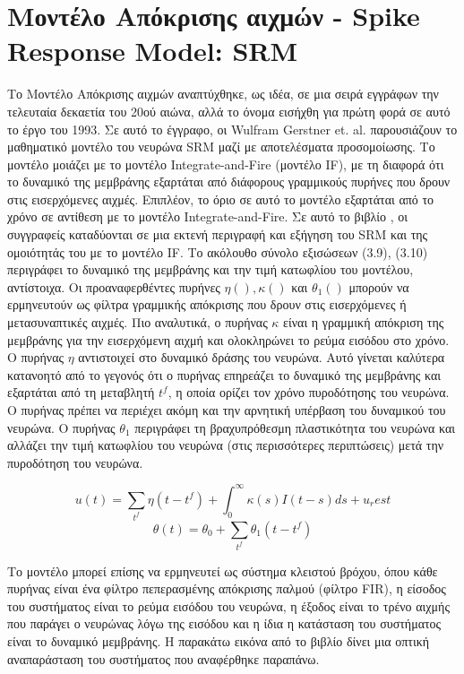 \documentclass[12pt]{report}
\begin{document}
\medskip

\section{Μοντέλο Απόκρισης αιχμών - \textlatin{Spike Response Model: SRM}}

Το Μοντέλο Απόκρισης αιχμών αναπτύχθηκε, ως ιδέα, σε μια σειρά εγγράφων την τελευταία δεκαετία του 20ού αιώνα, αλλά το όνομα εισήχθη για πρώτη φορά σε αυτό το έργο \cite{Gerstner1993} του 1993. Σε αυτό το έγγραφο, οι \textlatin{Wulfram Gerstner et. al.} παρουσιάζουν το μαθηματικό μοντέλο του νευρώνα \textlatin{SRM} μαζί με αποτελέσματα προσομοίωσης. Το μοντέλο μοιάζει με το μοντέλο \textlatin{Integrate-and-Fire} (μοντέλο \textlatin{IF}), με τη διαφορά ότι το δυναμικό της μεμβράνης εξαρτάται από διάφορους γραμμικούς πυρήνες που δρουν στις εισερχόμενες αιχμές. Επιπλέον, το όριο σε αυτό το μοντέλο εξαρτάται από το χρόνο σε αντίθεση με το μοντέλο \textlatin{Integrate-and-Fire}. Σε αυτό το βιβλίο \cite{gerstner2014}, οι συγγραφείς καταδύονται σε μια εκτενή περιγραφή και εξήγηση του \textlatin{SRM} και της ομοιότητάς του με το μοντέλο \textlatin{IF}. Το ακόλουθο σύνολο εξισώσεων (3.9), (3.10) περιγράφει το δυναμικό της μεμβράνης και την τιμή κατωφλίου του μοντέλου, αντίστοιχα. Οι προαναφερθέντες πυρήνες \(\eta(), \kappa()\) και \(\theta_1()\) μπορούν να ερμηνευτούν ως φίλτρα γραμμικής απόκρισης που δρουν στις εισερχόμενες ή μετασυναπτικές αιχμές. Πιο αναλυτικά, ο πυρήνας \(\kappa\) είναι η γραμμική απόκριση της μεμβράνης για την εισερχόμενη αιχμή και ολοκληρώνει το ρεύμα εισόδου στο χρόνο. Ο πυρήνας \(\eta\) αντιστοιχεί στο δυναμικό δράσης του νευρώνα. Αυτό γίνεται καλύτερα κατανοητό από το γεγονός ότι ο πυρήνας επηρεάζει το δυναμικό της μεμβράνης και εξαρτάται από τη μεταβλητή \(t^f\), η οποία ορίζει τον χρόνο πυροδότησης του νευρώνα. Ο πυρήνας πρέπει να περιέχει ακόμη και την αρνητική υπέρβαση του δυναμικού του νευρώνα. Ο πυρήνας \(\theta_1\) περιγράφει τη βραχυπρόθεσμη πλαστικότητα του νευρώνα και αλλάζει την τιμή κατωφλίου του νευρώνα (στις περισσότερες περιπτώσεις) μετά την πυροδότηση του νευρώνα.

\begin{equation}
u(t) = \sum_{t^f}\eta(t-t^f)+\int_0^\infty\kappa(s)I(t-s)ds+u_rest
\end{equation}
\begin{equation}
\theta(t) = \theta_0 + \sum_{t^f}\theta_1(t-t^f)
\end{equation}

Το μοντέλο μπορεί επίσης να ερμηνευτεί ως σύστημα κλειστού βρόχου, όπου κάθε πυρήνας είναι ένα φίλτρο πεπερασμένης απόκρισης παλμού (φίλτρο \textlatin{FIR}), η είσοδος του συστήματος είναι το ρεύμα εισόδου του νευρώνα, η έξοδος είναι το τρένο αιχμής που παράγει ο νευρώνας λόγω της εισόδου και η ίδια η κατάσταση του συστήματος είναι το δυναμικό μεμβράνης. Η παρακάτω εικόνα από το βιβλίο \cite{gerstner2014} δίνει μια οπτική αναπαράσταση του συστήματος που αναφέρθηκε παραπάνω.
\end{document}

